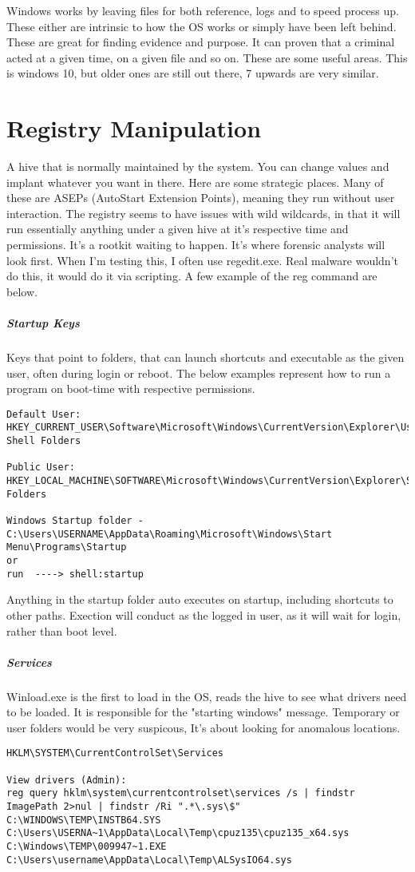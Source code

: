 Windows works by leaving files for both reference, logs and to speed process up. These either are intrinsic to how the OS works or simply have been left behind. 
These are great for finding evidence and purpose. It can proven that a criminal acted at a given time, on a given file and so on. These are some useful areas. This is windows 10, but older ones are still out there, 7 upwards are very similar.

\section{Registry Manipulation}
A hive that is normally maintained by the system. You can change values and implant whatever you want in there. Here are some strategic places. 
Many of these are ASEPs (AutoStart Extension Points), meaning they run without user interaction. The registry seems to have issues with wild wildcards, 
in that it will run essentially anything under a given hive at it's respective time and permissions. It's a rootkit waiting to happen. 
It's where forensic analysts will look first. When I'm testing this, I often use regedit.exe. Real malware wouldn't do this, it would do it via scripting. 
A few example of the reg command are below. 


\subparagraph{Startup Keys}
Keys that point to folders, that can launch shortcuts and executable as the given user, often during login or reboot. The below examples represent how to run a program on boot-time with respective permissions.
\begin{lstlisting}[label=RegistryStartupKeys,caption=Registry Startup Key Locations]
Default User:
HKEY_CURRENT_USER\Software\Microsoft\Windows\CurrentVersion\Explorer\User Shell Folders 

Public User:
HKEY_LOCAL_MACHINE\SOFTWARE\Microsoft\Windows\CurrentVersion\Explorer\Shell Folders

Windows Startup folder - 
C:\Users\USERNAME\AppData\Roaming\Microsoft\Windows\Start Menu\Programs\Startup
or
run  ----> shell:startup
\end{lstlisting}

Anything in the startup folder auto executes on startup, including shortcuts to other paths. Exection will conduct as the logged in user, as it will wait for login, rather than boot level.


\subparagraph{Services}
Winload.exe is the first to load in the OS, reads the hive to see what drivers need to be loaded. It is responsible for the "starting windows" message. 
Temporary or user folders would be very suspicous, It's about looking for anomalous locations.
\begin{lstlisting}[label=RegistryServices,caption=Registry Service Locations]
HKLM\SYSTEM\CurrentControlSet\Services

View drivers (Admin):
reg query hklm\system\currentcontrolset\services /s | findstr ImagePath 2>nul | findstr /Ri ".*\.sys\$"
C:\WINDOWS\TEMP\INSTB64.SYS C:\Users\USERNA~1\AppData\Local\Temp\cpuz135\cpuz135_x64.sys C:\Windows\TEMP\009947~1.EXE C:\Users\username\AppData\Local\Temp\ALSysIO64.sys
\end{lstlisting}



